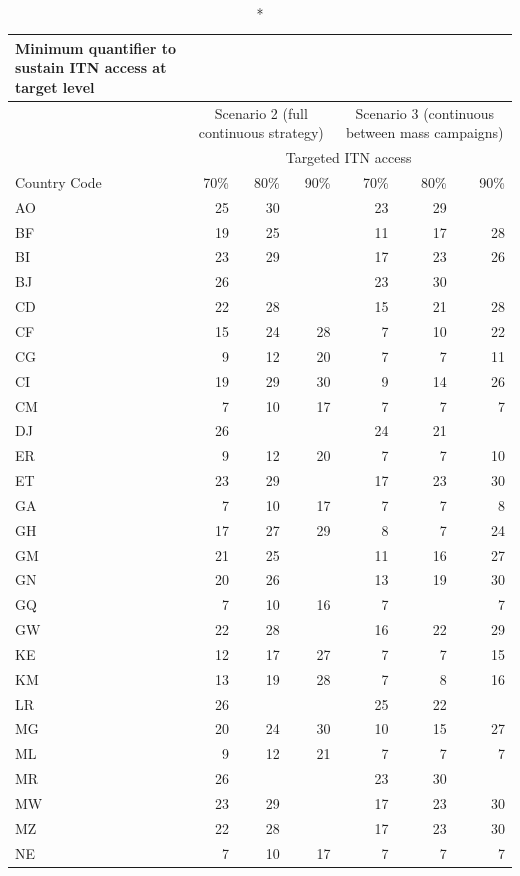 \documentclass[review,
3p]{elsarticle} %
\begin{document}
\captionsetup[table]{labelformat=empty,skip=1pt}
\begin{longtable}{lrrrrrr}
\caption*{
{\large Minimum quantifier to sustain ITN access at target level}
} \\ 
\toprule
 & \multicolumn{3}{c}{Scenario 2 (full continuous strategy)} & \multicolumn{3}{c}{Scenario 3 (continuous between mass campaigns)} \\ 
\cmidrule(lr){2-4} \cmidrule(lr){5-7}
 & \multicolumn{6}{c}{Targeted ITN access} \\ 
\cmidrule(lr){2-7}
Country Code & 70\% & 80\% & 90\% & 70\% & 80\% & 90\% \\ 
\midrule
AO & 25 & 30 &  & 23 & 29 &  \\ 
BF & 19 & 25 &  & 11 & 17 & 28 \\ 
BI & 23 & 29 &  & 17 & 23 & 26 \\ 
BJ & 26 &  &  & 23 & 30 &  \\ 
CD & 22 & 28 &  & 15 & 21 & 28 \\ 
CF & 15 & 24 & 28 & 7 & 10 & 22 \\ 
CG & 9 & 12 & 20 & 7 & 7 & 11 \\ 
CI & 19 & 29 & 30 & 9 & 14 & 26 \\ 
CM & 7 & 10 & 17 & 7 & 7 & 7 \\ 
DJ & 26 &  &  & 24 & 21 &  \\ 
ER & 9 & 12 & 20 & 7 & 7 & 10 \\ 
ET & 23 & 29 &  & 17 & 23 & 30 \\ 
GA & 7 & 10 & 17 & 7 & 7 & 8 \\ 
GH & 17 & 27 & 29 & 8 & 7 & 24 \\ 
GM & 21 & 25 &  & 11 & 16 & 27 \\ 
GN & 20 & 26 &  & 13 & 19 & 30 \\ 
GQ & 7 & 10 & 16 & 7 &  & 7 \\ 
GW & 22 & 28 &  & 16 & 22 & 29 \\ 
KE & 12 & 17 & 27 & 7 & 7 & 15 \\ 
KM & 13 & 19 & 28 & 7 & 8 & 16 \\ 
LR & 26 &  &  & 25 & 22 &  \\ 
MG & 20 & 24 & 30 & 10 & 15 & 27 \\ 
ML & 9 & 12 & 21 & 7 & 7 & 7 \\ 
MR & 26 &  &  & 23 & 30 &  \\ 
MW & 23 & 29 &  & 17 & 23 & 30 \\ 
MZ & 22 & 28 &  & 17 & 23 & 30 \\ 
NE & 7 & 10 & 17 & 7 & 7 & 7 \\ 

\end{longtable}
\end{document}
